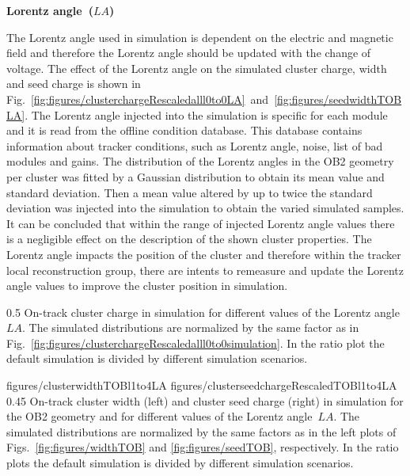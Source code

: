 \textbf{Lorentz angle~($LA$)}

The Lorentz angle used in simulation is dependent on the electric and magnetic field and therefore the Lorentz angle should be updated with the change of voltage. The effect of the Lorentz angle on the simulated cluster charge, width and seed charge is shown in Fig.~\ref{fig:figures/clusterchargeRescaledalll0to0LA}~and~\ref{fig:figures/seedwidthTOBLA}. The Lorentz angle injected into the simulation is specific for each module and it is read from the offline condition database. This database contains information about tracker conditions, such as Lorentz angle, noise, list of bad modules and gains.  The distribution of the Lorentz angles in the OB2 geometry per cluster was fitted by  a Gaussian distribution to obtain its mean value and standard deviation. Then a mean value altered by up to twice the standard deviation was injected into the simulation to obtain the varied simulated samples. It can be concluded that within the range of injected Lorentz angle values there is a negligible effect on the description of the shown cluster properties. The Lorentz angle impacts the position of the cluster and therefore within the tracker local reconstruction group, there are intents to remeasure and update the Lorentz angle values to improve the cluster position in simulation.


                 {0.5}       %
                 { On-track cluster charge in simulation for different values of the Lorentz angle~$LA$.   The simulated distributions are normalized by the same factor as in Fig.~\ref{fig:figures/clusterchargeRescaledalll0to0simulation}.  In the ratio plot the default simulation is divided by different simulation scenarios. }

                 {figures/clusterwidthTOBl1to4LA}
                 {figures/clusterseedchargeRescaledTOBl1to4LA} %
                 {0.45}       %
                 { On-track cluster width (left) and cluster seed charge (right) in simulation for the OB2 geometry and for different values of the Lorentz angle~$LA$.  The simulated distributions are normalized by the same factors as in the left plots of Figs.~\ref{fig:figures/widthTOB} and \ref{fig:figures/seedTOB}, respectively.   In the ratio plots the default simulation is divided by different simulation scenarios. }


